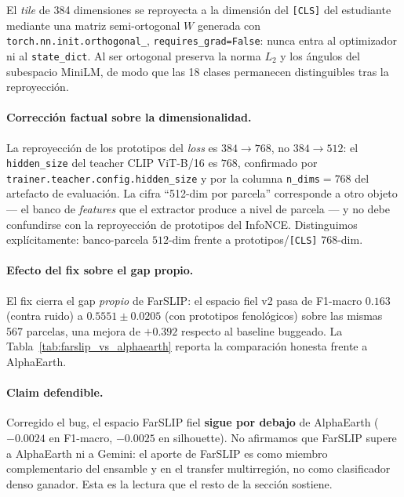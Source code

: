 El \textit{tile} de 384 dimensiones se reproyecta a la dimensión del
\texttt{[CLS]} del estudiante mediante una matriz semi-ortogonal $W$ generada
con \texttt{torch.nn.init.orthogonal\_}, \texttt{requires\_grad=False}: nunca
entra al optimizador ni al \texttt{state\_dict}. Al ser ortogonal preserva la
norma $L_2$ y los ángulos del subespacio MiniLM, de modo que las 18 clases
permanecen distinguibles tras la reproyección.

\paragraph{Corrección factual sobre la dimensionalidad.}
La reproyección de los prototipos del \textit{loss} es \textbf{$384\rightarrow768$},
no $384\rightarrow512$: el \texttt{hidden\_size} del teacher CLIP ViT-B/16 es
$768$, confirmado por \texttt{trainer.teacher.config.hidden\_size} y por la
columna \texttt{n\_dims}$=768$ del artefacto de evaluación. La cifra ``512-dim
por parcela'' corresponde a otro objeto --- el banco de \textit{features} que el
extractor produce a nivel de parcela --- y no debe confundirse con la
reproyección de prototipos del InfoNCE. Distinguimos explícitamente:
banco-parcela $512$-dim frente a prototipos/\texttt{[CLS]} $768$-dim.

\paragraph{Efecto del fix sobre el gap propio.}
El fix cierra el gap \textit{propio} de FarSLIP: el espacio fiel v2 pasa de
F1-macro $0.163$ (contra ruido) a $0.5551 \pm 0.0205$ (con prototipos
fenológicos) sobre las mismas 567 parcelas, una mejora de $+0.392$ respecto al
baseline buggeado. La Tabla~\ref{tab:farslip_vs_alphaearth} reporta la
comparación honesta frente a AlphaEarth.



\paragraph{Claim defendible.}
Corregido el bug, el espacio FarSLIP fiel \textbf{sigue por debajo} de AlphaEarth
($-0.0024$ en F1-macro, $-0.0025$ en silhouette). No afirmamos que FarSLIP supere
a AlphaEarth ni a Gemini: el aporte de FarSLIP es como miembro complementario del
ensamble y en el transfer multirregión, no como clasificador denso ganador. Esta
es la lectura que el resto de la sección sostiene.

